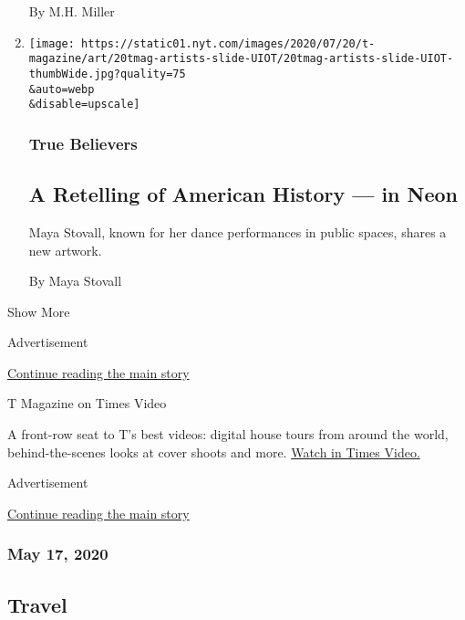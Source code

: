 \begin{enumerate}
  By M.H. Miller
\item
  \href{/2020/07/20/t-magazine/maya-stovall.html}{}

  \texttt{[image: https://static01.nyt.com/images/2020/07/20/t-magazine/art/20tmag-artists-slide-UIOT/20tmag-artists-slide-UIOT-thumbWide.jpg?quality=75\\\&auto=webp\\\&disable=upscale]}

  \hypertarget{true-believers-11}{%
  \subsubsection{True Believers}\label{true-believers-11}}

  \hypertarget{a-retelling-of-american-history--in-neon}{%
  \subsection{A Retelling of American History --- in
  Neon}\label{a-retelling-of-american-history--in-neon}}

  Maya Stovall, known for her dance performances in public spaces,
  shares a new artwork.

  By Maya Stovall
\end{enumerate}

Show More

Advertisement

\protect\hyperlink{after-mid2}{Continue reading the main story}

T Magazine on Times Video

A front-row seat to T's best videos: digital house tours from around the
world, behind-the-scenes looks at cover shoots and more.
\href{https://www.nytimes.com/video/t-magazine}{Watch in Times Video.}

Advertisement

\protect\hyperlink{after-mktg}{Continue reading the main story}

\hypertarget{may-17-2020}{%
\subsubsection{May 17, 2020}\label{may-17-2020}}

\href{https://www.nytimes.com/issue/t-magazine/2020/05/02/ts-may-17-travel-issue}{}

\hypertarget{travel}{%
\subsection{Travel}\label{travel}}

